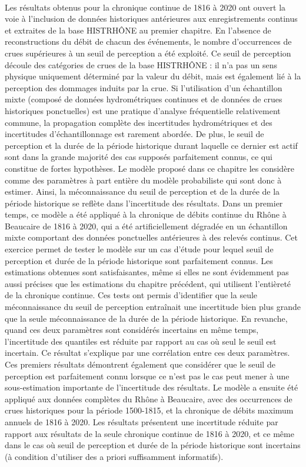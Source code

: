 	\paragraph{} Les résultats obtenus pour la chronique continue de 1816 à 2020 ont ouvert la voie à l'inclusion de données historiques antérieures aux enregistrements continus et extraites de la base HISTRHÔNE au premier chapitre. En l'absence de reconstructions du débit de chacun des événements, le nombre d'occurrences de crues supérieures à un seuil de perception a été exploité. Ce seuil de perception découle des catégories de crues de la base HISTRHÔNE : il n'a pas un sens physique uniquement déterminé par la valeur du débit, mais est également lié à la perception des dommages induits par la crue. Si l'utilisation d'un échantillon mixte (composé de données hydrométriques continues et de données de crues historiques ponctuelles) est une pratique d'analyse fréquentielle relativement commune, la propagation complète des incertitudes hydrométriques et des incertitudes d'échantillonnage est rarement abordée. De plus, le seuil de perception et la durée de la période historique durant laquelle ce dernier est actif sont dans la grande majorité des cas supposés parfaitement connus, ce qui constitue de fortes hypothèses. Le modèle proposé dans ce chapitre les considère comme des paramètres à part entière du modèle probabiliste qui sont donc à estimer. Ainsi, la méconnaissance du seuil de perception et de la durée de la période historique se reflète dans l'incertitude des résultats. Dans un premier temps, ce modèle a été appliqué à la chronique de débits continue du Rhône à Beaucaire de 1816 à 2020, qui a été artificiellement dégradée en un échantillon mixte comportant des données ponctuelles antérieures à des relevés continus. Cet exercice permet de tester le modèle sur un cas d'étude pour lequel seuil de perception et durée de la période historique sont parfaitement connus. Les estimations obtenues sont satisfaisantes, même si elles ne sont évidemment pas aussi précises que les estimations du chapitre précédent, qui utilisent l'entièreté de la chronique continue. Ces tests ont permis d'identifier que la seule méconnaissance du seuil de perception entraînait une incertitude bien plus grande que la seule méconnaissance de la durée de la période historique. En revanche, quand ces deux paramètres sont considérés incertains en même temps, l'incertitude des quantiles est réduite par rapport au cas où seul le seuil est incertain. Ce résultat s'explique par une corrélation entre ces deux paramètres. Ces premiers résultats démontrent également que considérer que le seuil de perception est parfaitement connu lorsque ce n'est pas le cas peut mener à une sous-estimation importante de l'incertitude des résultats. Le modèle a ensuite été appliqué aux données complètes du Rhône à Beaucaire, avec des occurrences de crues historiques pour la période 1500-1815, et la chronique de débits maximum annuels de 1816 à 2020. Les résultats présentent une incertitude réduite par rapport aux résultats de la seule chronique continue de 1816 à 2020, et ce même dans le cas où seuil de perception et durée de la période historique sont incertains (à condition d'utiliser des a priori suffisamment informatifs). 